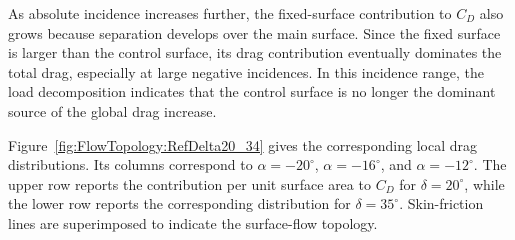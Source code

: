 \documentclass[journal ]{new-aiaa}
\begin{document}
As absolute incidence increases further, the fixed-surface contribution to $C_D$ also grows because separation develops over the main surface.
Since the fixed surface is larger than the control surface, its drag contribution eventually dominates the total drag, especially at large negative incidences.
In this incidence range, the load decomposition indicates that the control surface is no longer the dominant source of the global drag increase.

Figure~\ref{fig:FlowTopology:RefDelta20_34} gives the corresponding local drag distributions. Its columns correspond to \(\alpha=-20^\circ\), \(\alpha=-16^\circ\), and \(\alpha=-12^\circ\).
The upper row reports the contribution per unit surface area to \(C_D\) for \(\delta=20^\circ\), while the lower row reports the corresponding distribution for \(\delta=35^\circ\).
Skin-friction lines are superimposed to indicate the surface-flow topology.
\end{document}
